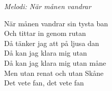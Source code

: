{\footnotesize\textit{Melodi: När månen vandrar}}\par
\vspace{10pt}
När månen vandrar sin tysta ban\\
Och tittar in genom rutan\\
Då tänker jag att på ljusa dan\\
Då kan jag klara mig utan\\
Då kan jag klara mig utan måne\\
Men utan renat och utan Skåne\\
Det vete fan, det vete fan

